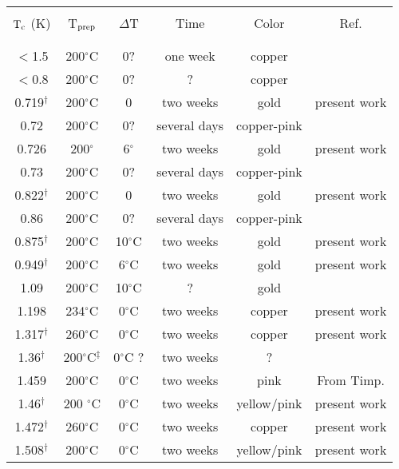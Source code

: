 {\newpage
\clearpage
\samepage \begin{table}
\label{stitc}
\begin{center}
\begin{tabular}{||c|c|c|c|c|c||}
\hline
& & & & & \\ 
$\rm T_c$ (K) & T$\rm _{prep}$ & $\Delta$T & Time & Color & Ref.\\ 
& & & & & \\ 
\hline
& & & & & \\ 
$<$1.5 & 200$^{\circ}$C  & 0?  & one week & copper & \cite{koike81}\\ 
$<$0.8 & 200$^{\circ}$C  & 0? & ?  &  copper & \cite{alexander81}\\ 
0.719$^{\dagger}$ & 200$^{\circ}$C  & 0 & two weeks & gold& present work\\ 	%
0.72 & 200$^{\circ}$C & 0? & several days & copper-pink & \cite{iye82}\\ 
0.726 & 200$^{\circ}$  & 6$^{\circ}$ & two weeks &gold & present work\\    %
0.73 & 200$^{\circ}$C & 0? & several days & copper-pink & \cite{iye82}\\ 
0.822$^{\dagger}$ & 200$^{\circ}$C & 0 & two weeks & gold & present work\\ 	%
0.86 & 200$^{\circ}$C & 0?  & several days & copper-pink & \cite{iye82}\\ 
0.875$^{\dagger}$ & 200$^{\circ}$C  & 10$^{\circ}$C  & two weeks & gold & present work \\ 	%
0.949$^{\dagger}$ & 200$^{\circ}$C  & 6$^{\circ}$C  & two weeks & gold & present work \\  %
1.09 & 200$^{\circ}$C & 10$^{\circ}$C & ? & gold & \cite{J140}\\ 
1.198 &234$^{\circ}$C   & 0$^{\circ}$C  & two weeks & copper & present work\\ 	%
1.317$^{\dagger}$ &260$^{\circ}$C  & 0$^{\circ}$C   & two weeks& copper & present work\\ 	%
1.36$^{\dagger}$ & 200$^{\circ}$C$^{\ddagger}$ & 0$^{\circ}$C ? & two weeks
& ? & \cite{delong82} \\ 
1.459 &200$^{\circ}$C & 0$^{\circ}$C & two weeks &pink & From Timp. \\ 	%
1.46$^{\dagger}$ & 200 $^{\circ}$C & 0$^{\circ}$C  & two weeks  & yellow/pink & present work \\ 	%
1.472$^{\dagger}$ &260$^{\circ}$C & 0$^{\circ}$C  & two weeks & copper & present work\\ 	%
1.508$^{\dagger}$ & 200$^{\circ}$C  & 0$^{\circ}$C  & two weeks & yellow/pink & present work \\    %

\end{tabular}
\end{center}
\end{table}}

